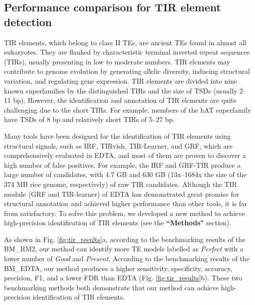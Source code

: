 \documentclass{bmcart}
\begin{document}
\subsection*{Performance comparison for TIR element detection}
TIR elements, which belong to class II TEs, are ancient TEs found in almost all eukaryotes. They are flanked by characteristic terminal inverted repeat sequences (TIRs), usually presenting in low to moderate numbers\cite{wicker2007unified}. TIR elements may contribute to genome evolution by generating allelic diversity, inducing structural variation, and regulating gene expression\cite{su2019tir}. TIR elements are divided into nine known superfamilies by the distinguished TIRs and the size of TSDs (usually 2–11 bp). However, the  identification and annotation of TIR elements are quite challenging due to the short TIRs. For example, members of the hAT superfamily have TSDs of 8 bp and relatively short TIRs of 5–27 bp\cite{kempken2001hat}.

Many tools have been designed for the identification of TIR elements using structural signals, such as IRF\cite{warburton2004inverted}, TIRvish\cite{gremme2013genometools}, TIR-Learner\cite{su2019tir}, and GRF\cite{shi2019generic}, which are comprehensively evaluated in EDTA, and most of them are proven to discover a high number of false positives\cite{ou2019benchmarking}. For example, the IRF and GRF-TIR produce a large number of candidates, with 4.7 GB and 630 GB (13x–1684x the size of the 374 MB rice genome, respectively) of raw TIR candidates. Although the TIR module (GRF and TIR-learner) of EDTA has demonstrated great promise for structural annotation and achieved higher performance than other tools\cite{ou2019benchmarking}, it is far from satisfactory. To solve this problem, we developed a new method to achieve high-precision identification of TIR elements (see the \textbf{``Methods"} section).

As shown in Fig. \ref{fig:tir_results}a, according to the benchmarking results of the BM\_RM2, our method can identify more TE models labelled as \emph{Perfect} with a lower number of \emph{Good} and \emph{Present}. According to the benchmarking results of the BM\_EDTA, our method produces a higher sensitivity, specificity, accuracy, precision, F1, and a lower FDR than EDTA (Fig. \ref{fig:tir_results}b). These two benchmarking methods both demonstrate that our method can achieve high-precision identification of TIR elements.
\end{document}
